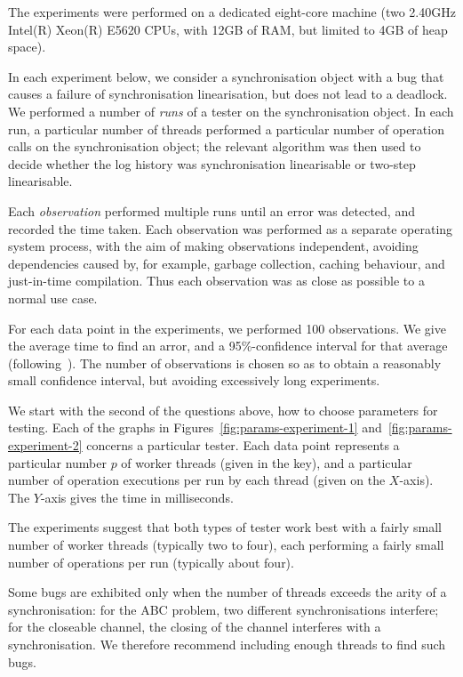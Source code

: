 The experiments were performed on a dedicated eight-core machine (two 2.40GHz
Intel(R) Xeon(R) E5620 CPUs, with 12GB of RAM, but limited to 4GB of heap
space).

In each experiment below, we consider a synchronisation object with a bug that
causes a failure of synchronisation linearisation, but does not lead to a
deadlock.  We performed a number of \emph{runs} of a tester on the
synchronisation object.  In each run, a particular number of threads performed
a particular number of operation calls on the synchronisation object; the
relevant algorithm was then used to decide whether the log history was
synchronisation linearisable or two-step linearisable.

Each \emph{observation} performed multiple runs until an error was detected,
and recorded the time taken.  Each observation was performed as a separate
operating system process, with the aim of making observations independent,
avoiding dependencies caused by, for example, garbage collection, caching
behaviour, and just-in-time compilation.  Thus each observation was as close
as possible to a normal use case.

For each data point in the experiments, we performed 100 observations.  We
give the average time to find an arror, and a 95\%-confidence interval for
that average (following~\cite{GBE2007}).  The number of observations is chosen
so as to obtain a reasonably small confidence interval, but avoiding
excessively long experiments.


We start with the second of the questions above, how to choose parameters for
testing.  Each of the graphs in Figures~\ref{fig:params-experiment-1}
and~\ref{fig:params-experiment-2} concerns a particular tester.  Each data
point represents a particular number $p$ of worker threads (given in the key),
and a particular number of operation executions per run by each thread (given
on the $X$-axis).
The $Y$-axis gives the time in milliseconds.



The experiments suggest that both types of tester work best with a fairly
small number of worker threads (typically two to four), each performing a
fairly small number of operations per run (typically about four).

Some bugs are exhibited only when the number of threads exceeds the arity of a
synchronisation: for the ABC problem, two different synchronisations
interfere; for the closeable channel, the closing of the channel interferes
with a synchronisation.  We therefore recommend including enough threads to
find such bugs.


